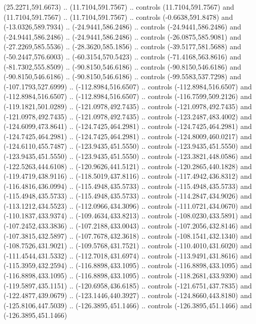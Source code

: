 \begin{scope}[shift={(407.03862,-246.29561)}]
    (25.2271,591.6673) .. (11.7104,591.7567) .. controls (11.7104,591.7567) and
    (11.7104,591.7567) .. (11.7104,591.7567) .. controls (-0.6638,591.8478) and
    (-13.0326,589.7934) .. (-24.9441,586.2486) .. controls (-24.9441,586.2486) and
    (-24.9441,586.2486) .. (-24.9441,586.2486) .. controls (-26.0875,585.9081) and
    (-27.2269,585.5536) .. (-28.3620,585.1856) .. controls (-39.5177,581.5688) and
    (-50.2447,576.6003) .. (-60.3154,570.5423) .. controls (-71.4168,563.8616) and
    (-81.7302,555.8509) .. (-90.8150,546.6186) .. controls (-90.8150,546.6186) and
    (-90.8150,546.6186) .. (-90.8150,546.6186) .. controls (-99.5583,537.7298) and
    (-107.1793,527.6999) .. (-112.8984,516.6507) .. controls (-112.8984,516.6507)
    and (-112.8984,516.6507) .. (-112.8984,516.6507) .. controls
    (-116.7599,509.2126) and (-119.1821,501.0289) .. (-121.0978,492.7435) ..
    controls (-121.0978,492.7435) and (-121.0978,492.7435) .. (-121.0978,492.7435)
    .. controls (-123.2487,483.4002) and (-124.6099,473.8641) ..
    (-124.7425,464.2981) .. controls (-124.7425,464.2981) and (-124.7425,464.2981)
    .. (-124.7425,464.2981) .. controls (-124.8009,460.0217) and
    (-124.6110,455.7487) .. (-123.9435,451.5550) .. controls (-123.9435,451.5550)
    and (-123.9435,451.5550) .. (-123.9435,451.5550) .. controls
    (-123.3821,448.0586) and (-122.5263,444.6108) .. (-120.9626,441.5121) ..
    controls (-120.2865,440.1828) and (-119.4719,438.9116) .. (-118.5019,437.8116)
    .. controls (-117.4942,436.8312) and (-116.4816,436.0994) ..
    (-115.4948,435.5733) .. controls (-115.4948,435.5733) and (-115.4948,435.5733)
    .. (-115.4948,435.5733) .. controls (-114.2847,434.9026) and
    (-113.1212,434.5523) .. (-112.0966,434.3096) .. controls (-111.0721,434.0670)
    and (-110.1837,433.9374) .. (-109.4634,433.8213) .. controls
    (-108.0230,433.5891) and (-107.2452,433.3836) .. (-107.2188,433.0043) ..
    controls (-107.2056,432.8146) and (-107.3815,432.5897) .. (-107.7678,432.3618)
    .. controls (-108.1541,432.1340) and (-108.7526,431.9021) ..
    (-109.5768,431.7521) .. controls (-110.4010,431.6020) and (-111.4544,431.5332)
    .. (-112.7018,431.6974) .. controls (-113.9491,431.8616) and
    (-115.3959,432.2594) .. (-116.8898,433.1095) .. controls (-116.8898,433.1095)
    and (-116.8898,433.1095) .. (-116.8898,433.1095) .. controls
    (-118.2681,433.9390) and (-119.5897,435.1151) .. (-120.6958,436.6185) ..
    controls (-121.6751,437.7835) and (-122.4877,439.0679) .. (-123.1446,440.3927)
    .. controls (-124.8660,443.8180) and (-125.8106,447.5039) ..
    (-126.3895,451.1466) .. controls (-126.3895,451.1466) and (-126.3895,451.1466)

\end{scope}
